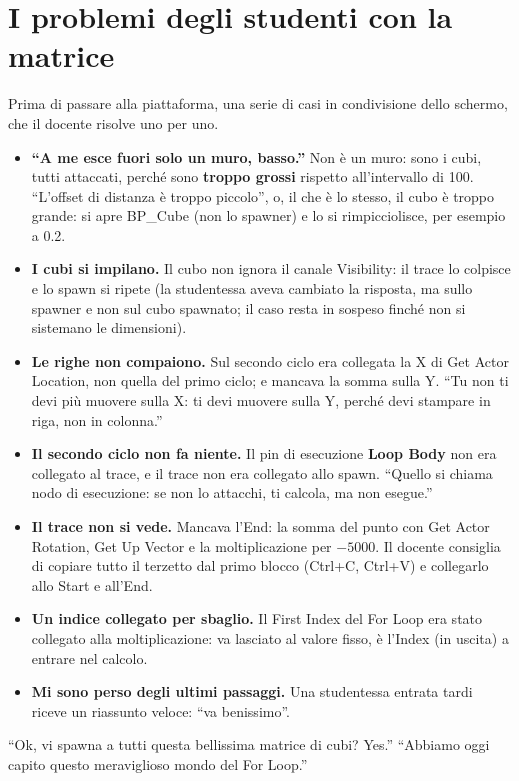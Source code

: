 \section{I problemi degli studenti con la matrice}
\label{ue6:sec:problemimatrice}

Prima di passare alla piattaforma, una serie di casi in condivisione dello schermo, che
il docente risolve uno per uno.
\begin{itemize}
  \item \textbf{``A me esce fuori solo un muro, basso.''} Non è un muro: sono i cubi,
        tutti attaccati, perché sono \textbf{troppo grossi} rispetto all'intervallo di
        100. ``L'offset di distanza è troppo piccolo'', o, il che è lo stesso, il cubo è
        troppo grande: si apre BP\_Cube (non lo spawner) e lo si rimpicciolisce, per
        esempio a 0.2.
  \item \textbf{I cubi si impilano.} Il cubo non ignora il canale Visibility: il trace
        lo colpisce e lo spawn si ripete (la studentessa aveva cambiato la risposta, ma
        sullo spawner e non sul cubo spawnato; il caso resta in sospeso finché non si
        sistemano le dimensioni).
  \item \textbf{Le righe non compaiono.} Sul secondo ciclo era collegata la X di Get
        Actor Location, non quella del primo ciclo; e mancava la somma sulla Y. ``Tu non
        ti devi più muovere sulla X: ti devi muovere sulla Y, perché devi stampare in
        riga, non in colonna.''
  \item \textbf{Il secondo ciclo non fa niente.} Il pin di esecuzione \textbf{Loop Body}
        non era collegato al trace, e il trace non era collegato allo spawn. ``Quello si
        chiama nodo di esecuzione: se non lo attacchi, ti calcola, ma non esegue.''
  \item \textbf{Il trace non si vede.} Mancava l'End: la somma del punto con Get Actor
        Rotation, Get Up Vector e la moltiplicazione per $-5000$. Il docente consiglia di
        copiare tutto il terzetto dal primo blocco (Ctrl+C, Ctrl+V) e collegarlo allo
        Start e all'End.
  \item \textbf{Un indice collegato per sbaglio.} Il First Index del For Loop era stato
        collegato alla moltiplicazione: va lasciato al valore fisso, è l'Index (in
        uscita) a entrare nel calcolo.
  \item \textbf{Mi sono perso degli ultimi passaggi.} Una studentessa entrata tardi
        riceve un riassunto veloce: ``va benissimo''.
\end{itemize}
``Ok, vi spawna a tutti questa bellissima matrice di cubi? Yes.'' ``Abbiamo oggi capito
questo meraviglioso mondo del For Loop.''

